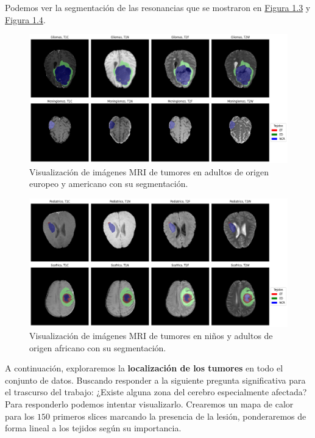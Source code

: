 Podemos ver la segmentación de las resonancias que se mostraron en \href{fig:visual0}{Figura 1.3} y \href{fig:visual1}{Figura 1.4}.
\begin{figure}[!h]
	\centering
	\includegraphics[width=1.0\linewidth]{imagenes/segimagenesMRI.png}
	\caption{Visualización de imágenes MRI de tumores en adultos de origen europeo y americano con su segmentación.}
\end{figure}

\begin{figure}[!h]
	\centering
	\includegraphics[width=1.0\linewidth]{imagenes/segimagenesSSAPEDMRI.png}
	\caption{Visualización de imágenes MRI de tumores en niños y adultos de origen africano con su segmentación.}
\end{figure}

\newpage
A continuación, exploraremos la \textbf{localización de los tumores} en todo el conjunto de datos. Buscando responder a la siguiente pregunta significativa para el trascurso del trabajo: ¿Existe alguna zona del cerebro especialmente afectada? Para responderlo podemos intentar visualizarlo. Crearemos un mapa de calor para los $150$ primeros slices marcando la presencia de la lesión, ponderaremos de forma lineal a los tejidos según su importancia.

